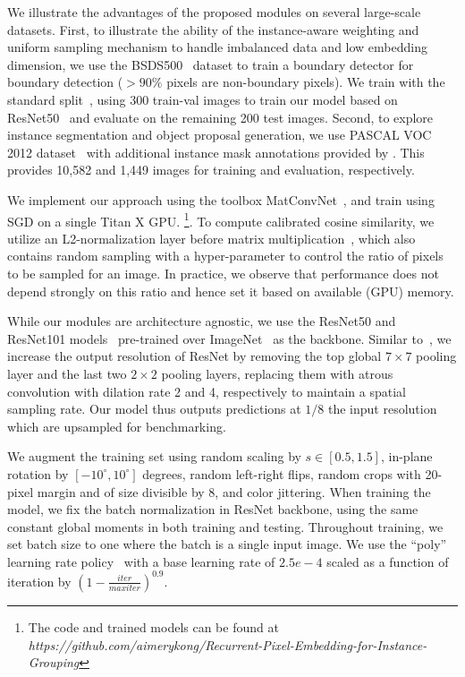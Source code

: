 \documentclass[10pt,twocolumn,letterpaper]{article}
\begin{document}
We illustrate the advantages of the proposed modules on several large-scale
datasets.  First, to illustrate the ability of the instance-aware weighting and
uniform sampling mechanism to handle imbalanced data and low embedding
dimension, we use the BSDS500~\cite{arbelaez2011contour} dataset to train a
boundary detector for boundary detection ($>90\%$ pixels are
non-boundary pixels).  We train with the standard
split~\cite{arbelaez2011contour,xie2015holistically},
using 300 train-val images to train our model based on
ResNet50~\cite{he2016deep} and evaluate on the remaining 200 test images.
Second, to explore instance segmentation and object proposal generation, we use
PASCAL VOC 2012 dataset~\cite{everingham2010pascal} with additional instance
mask annotations provided by \cite{hariharan2011semantic}. This provides 10,582
and 1,449 images for training and evaluation, respectively.

We implement our approach using the toolbox
MatConvNet~\cite{vedaldi2015matconvnet}, and train using SGD on a single Titan
X GPU.
\footnote{The code and trained models can be found at
{\color{blue} \emph{
{https://github.com/aimerykong/Recurrent-Pixel-Embedding-for-Instance-Grouping}}}}.
To compute calibrated cosine similarity, we utilize an L2-normalization
layer before matrix multiplication~\cite{kong2016low}, which also contains
random sampling with a hyper-parameter to control the ratio of pixels to be
sampled for an image.  In practice, we observe that performance does not depend
strongly on this ratio and hence set it based on available (GPU) memory.

While our modules are architecture agnostic, we use the
ResNet50 and ResNet101 models~\cite{he2016deep} pre-trained over
ImageNet~\cite{deng2009imagenet} as the backbone.
Similar to~\cite{chen2016deeplab}, we increase the output resolution of ResNet
by removing the top global $7\times 7$ pooling layer and the last two $2\times2$
pooling layers, replacing them with atrous convolution with dilation rate 2 and
4, respectively to maintain a spatial sampling rate. Our model thus outputs
predictions at $1/8$ the input resolution which are upsampled for benchmarking.

We augment the training set using random scaling by $s\in [0.5, 1.5]$, in-plane
rotation by $[-10^\circ,10^\circ]$ degrees, random left-right flips, random
crops with 20-pixel margin and of size divisible by 8, and color jittering.
When training the model, we fix the batch normalization in ResNet backbone,
using the same constant global moments in both training and testing.
Throughout training, we set batch size to one where the batch is a single input
image.
We use the ``poly'' learning rate policy~\cite{chen2016deeplab} with a base
learning rate of $2.5e-4$ scaled as a function of iteration by
$(1-\frac{iter}{maxiter})^{0.9}$.  
\end{document}
